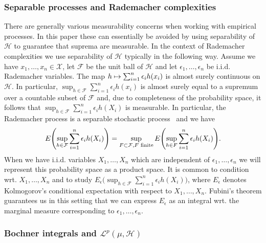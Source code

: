 \documentclass[AHL,Unicode,longabstracts,published]{cedram}
\theoremstyle{remark}
\newcommand{\X}{\mathcal{X}}
\newcommand{\cH}{\mathcal{H}}
\newcommand{\clL}{\mathcal{L}}
\newcommand{\clF}{\mathcal{F}}
\let\oldmapsto\mapsto
\renewcommand*{\mapsto}{\mathchoice{\longmapsto}{\oldmapsto}{\oldmapsto}{\oldmapsto}}
\let\originalleft\left
\let\originalright\right
\renewcommand{\left}{\mathopen{}\mathclose\bgroup\originalleft}
\renewcommand{\right}{\aftergroup\egroup\originalright}
\begin{document}
\subsubsection{Separable processes and Rademacher complexities}

There are generally various measurability concerns when working with empirical processes. In this paper these can essentially be avoided by using separability of $\cH$ to guarantee that suprema are measurable. In the context of Rademacher complexities we use separability of $\cH$ typically in the following way. Assume we have $x_1,\dots, x_n \in \X$, let $\clF$ be the unit ball of $\cH$ and let $\epsilon_1,\dots, \epsilon_n$ be i.i.d. Rademacher variables. The map $h \mapsto \sum_{i=1}^n \epsilon_i h(x_i)$ is almost surely continuous on $\cH$. In particular, $\sup_{h \in \clF} \sum_{i=1}^n \epsilon_i h(x_i)$ is almost surely equal to a supremum over a countable subset of $\clF$ and, due to completeness of the probability space, it follows that $\sup_{h \in \clF} \sum_{i=1}^n \epsilon_i h(X_i)$ is measurable. In particular, the Rademacher process is a separable stochastic process~\cite[Definition~4.1.2]{GINE15} and we have
\begin{equation}\label{eq:Rade_sep}
E\left(\sup_{h \in \clF} \sum_{i=1}^n \epsilon_i h(X_i)\right) = \sup_{F \subset \clF, F \text{ finite}} E\left(\sup_{h \in F} \sum_{i=1}^n \epsilon_i h(X_i)\right).
\end{equation}
When we have i.i.d. variables $X_1,\dots,X_n$ which are independent of $\epsilon_1,\dots, \epsilon_n$ we will represent this probability space as a product space. It is common to condition wrt. $X_1,\dots, X_n$ and to study $E_\epsilon \bigl(\sup_{h \in \clF} \sum_{i=1}^n \epsilon_i h(X_i) \bigr)$, where $E_\epsilon$ denotes Kolmogorov's conditional expectation with respect to $X_1,\dots, X_n$. Fubini's theorem guarantees us in this setting that we can express $E_\epsilon$ as an integral wrt. the marginal measure corresponding to $\epsilon_1,\dots, \epsilon_n$.

\subsubsection{Bochner integrals and $\clL^p(\mu,\cH)$}
\end{document}
